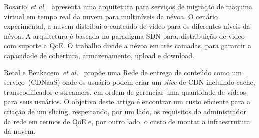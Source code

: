 

Rosario~\textit{et al.}~\cite{rosarioSENSORS2018} apresenta uma arquitetura para serviços de migração de maquina virtual em tempo real da nuvem para multiníveis da névoa. O cenário experimental, a nuvem distribui o conteúdo de video para os diferentes níveis da névoa. A arquitetura é baseada no paradigma SDN para, distribuição de video com suporte a QoE. O trabalho divide a névoa em três camadas, para garantir a capacidade de cobertura, armazenamento, upload e download.

Retal e Benkacem~\textit{et al.}~\cite{taleb:JSAC18, retalICC2017} propõe uma Rede de entrega de conteúdo como um serviço~(CDNaaS) onde os usuário podem criar um \textit{slice} de CDN incluindo cache, transcodificador e streamers, em ordem de gerenciar uma quantidade de vídeos para seus usuários.%
O objetivo deste artigo é encontrar um custo eficiente para a criação de um slicing, respeitando, por um lado, os requisitos do administrador da rede em termos de QoE e, por outro lado, o custo de montar a infraestrutura da nuvem.%


